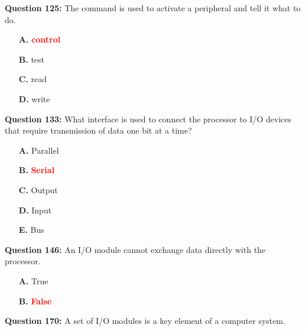 \documentclass[12pt,a4paper]{article}
\begin{document}
\vspace{0.5cm}

\vspace{0.5cm}

\textbf{Question 125:} The \underline{\hspace{1.5cm}} command is used to activate a peripheral and tell it what to do.

\begin{itemize}
    \item[\textbf{A.}] \textcolor{red}{\textbf{control}}
    \item[\textbf{B.}] test
    \item[\textbf{C.}] read
    \item[\textbf{D.}] write
\end{itemize}

\vspace{0.5cm}

\vspace{0.5cm}

\textbf{Question 133:} What interface is used to connect the processor to I/O devices that require transmission of data one bit at a time?

\begin{itemize}
    \item[\textbf{A.}] Parallel
    \item[\textbf{B.}] \textcolor{red}{\textbf{Serial}}
    \item[\textbf{C.}] Output
    \item[\textbf{D.}] Input
    \item[\textbf{E.}] Bus
\end{itemize}

\vspace{0.5cm}

\vspace{0.5cm}

\textbf{Question 146:} An I/O module cannot exchange data directly with the processor.

\begin{itemize}
    \item[\textbf{A.}] True
    \item[\textbf{B.}] \textcolor{red}{\textbf{False}}
\end{itemize}

\vspace{0.5cm}

\vspace{0.5cm}

\textbf{Question 170:} A set of I/O modules is a key element of a computer system.
\end{document}
